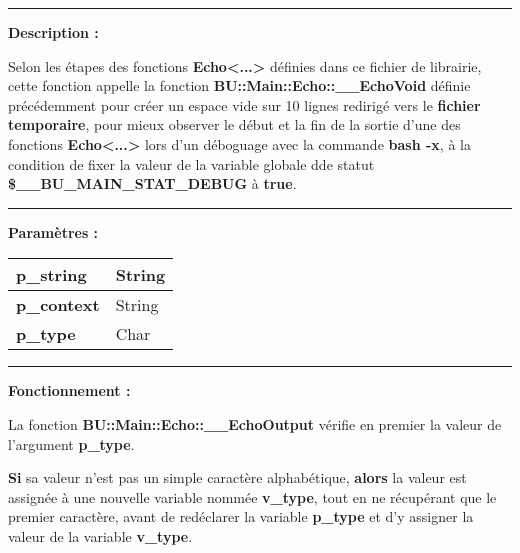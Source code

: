 \documentclass[a4paper,10pt]{article}
\begin{document}

\par\noindent\rule{\textwidth}{0.4pt}

\begin{justify}
    \textbf{Description :}

    Selon les étapes des fonctions \textbf{\color{func}Echo<...>} définies dans ce fichier de librairie, cette fonction appelle la fonction \textbf{\color{func}BU::Main::Echo::\_\_EchoVoid} définie précédemment pour créer un espace vide sur 10 lignes redirigé vers le \textbf{\color{path}fichier temporaire}, pour mieux observer le début et la fin de la sortie d'une des fonctions \textbf{\color{func}Echo<...>} lors d'un déboguage avec la commande \textbf{\color{cmds}bash -x}, à la condition de fixer la valeur de la variable globale dde statut \textbf{\color{vars}\$\_\_BU\_MAIN\_STAT\_DEBUG} à \textbf{true}.
\end{justify}


\par\noindent\rule{\textwidth}{0.4pt}

\begin{justify}
    \textbf{Paramètres :}

    \begin{tabular}{|l|l|}
        \hline
        \textbf{\color{vars}p\_string} & String\\
        \hline
        \textbf{\color{vars}p\_context} & String\\
        \hline
        \textbf{\color{vars}p\_type} & Char\\
        \hline
    \end{tabular}
\end{justify}

\setlength{\parskip}{2em}


\par\noindent\rule{\textwidth}{0.4pt}\setlength{\parskip}{1em}

\begin{justify}
    \textbf{Fonctionnement :}

    La fonction \textbf{\color{func}BU::Main::Echo::\_\_EchoOutput} vérifie en premier la valeur de l'argument \textbf{\color{vars}p\_type}.
\end{justify}

\begin{justify}
    \textbf{\color{cond}Si} sa valeur n'est pas un simple caractère alphabétique, \textbf{\color{cond}alors} la valeur est assignée à une nouvelle variable nommée \textbf{\color{vars}v\_type}, tout en ne récupérant que le premier caractère, avant de redéclarer la variable \textbf{\color{vars}p\_type} et d'y assigner la valeur de la variable \textbf{\color{vars}v\_type}.
\end{justify}
\end{document}
